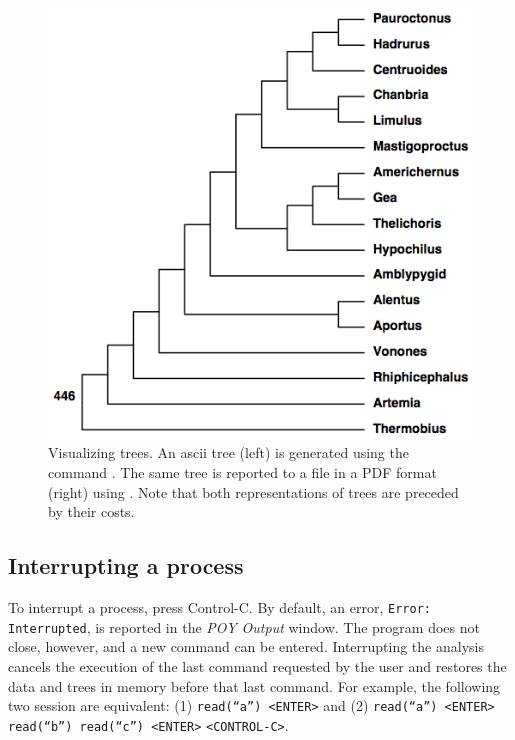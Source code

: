 \begin{figure}
\begin{minipage}[c]{0.5\textwidth}
	   	\includegraphics[width=\textwidth]{figures/pstree.jpg}
   	\end{minipage}
\caption{Visualizing trees. An ascii tree (left) is generated using the command
. The same tree is reported to a file in a PDF format (right) using . Note that both representations of trees  are preceded by their costs.}
\label{fig:trees}
\end{figure}

\subsection{Interrupting a process}
To interrupt a process, press Control-C. By default, an error, \texttt{Error:}\\ \texttt{Interrupted}, is reported in the \emph{POY Output} window. The program does not close, however, and a new command can be entered. Interrupting the analysis cancels the execution of the last command requested by the user and restores the data and trees in memory before that last command. For example, the following two session are equivalent: (1) \texttt{read(``a'') <ENTER>} and (2) \texttt{read(``a'') <ENTER>} \texttt{read(``b'') read(``c'') <ENTER>} \texttt{<CONTROL-C>}.

